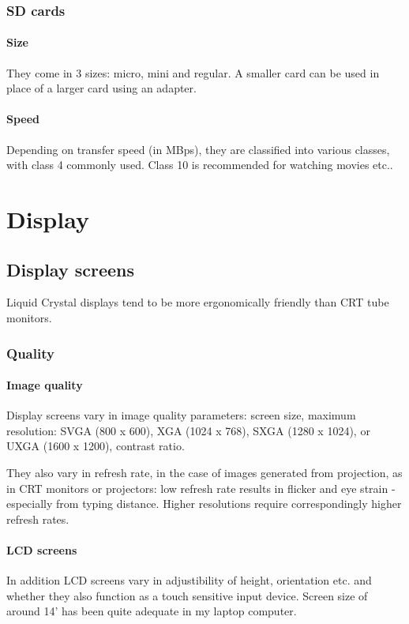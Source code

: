 \documentclass[oneside, article]{memoir}
\begin{document}
\subsection{SD cards}
\subsubsection{Size}
They come in 3 sizes: micro, mini and regular. A smaller card can be used in place of a larger card using an adapter.

\subsubsection{Speed}
Depending on transfer speed (in MBps), they are classified into various classes, with class 4 commonly used. Class 10 is recommended for watching movies etc..

\chapter{Display}
\section{Display screens}
Liquid Crystal displays tend to be more ergonomically friendly than CRT tube monitors.


\subsection{Quality}
\subsubsection{Image quality}
Display screens vary in image quality parameters: screen size, maximum resolution: SVGA (800 x 600), XGA (1024 x 768), SXGA (1280 x 1024), or UXGA (1600 x 1200), contrast ratio.

They also vary in refresh rate, in the case of images generated from projection, as in CRT monitors or projectors: low refresh rate results in flicker and eye strain - especially from typing distance. Higher resolutions require correspondingly higher refresh rates.

\subsubsection{LCD screens}
In addition LCD screens vary in adjustibility of height, orientation etc. and whether they also function as a touch sensitive input device. Screen size of around 14' has been quite adequate in my laptop computer.
\end{document}
